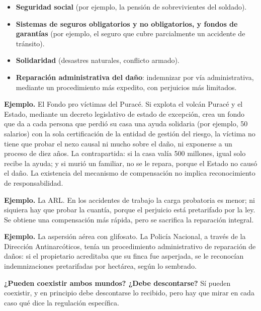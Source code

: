 \begin{itemize}
\item \textbf{Seguridad social} (por ejemplo, la pensión de sobrevivientes del soldado).
\item \textbf{Sistemas de seguros obligatorios y no obligatorios, y fondos de garantías} (por ejemplo, el seguro que cubre parcialmente un accidente de tránsito).
\item \textbf{Solidaridad} (desastres naturales, conflicto armado).
\item \textbf{Reparación administrativa del daño}: indemnizar por vía administrativa, mediante un procedimiento más expedito, con perjuicios más limitados.
\end{itemize}
\begin{ejemplo}
\textcolor[HTML]{4F6228}{\textbf{Ejemplo. }}El Fondo pro víctimas del Puracé. Si explota el volcán Puracé y el Estado, mediante un decreto legislativo de estado de excepción, crea un fondo que da a cada persona que perdió su casa una ayuda solidaria (por ejemplo, 50 salarios) con la sola certificación de la entidad de gestión del riesgo, la víctima no tiene que probar el nexo causal ni mucho sobre el daño, ni exponerse a un proceso de diez años. La contrapartida: si la casa valía 500 millones, igual solo recibe la ayuda; y si murió un familiar, no se le repara, porque el Estado no causó el daño. La existencia del mecanismo de compensación no implica reconocimiento de responsabilidad.
\par
\textcolor[HTML]{4F6228}{\textbf{Ejemplo. }}La ARL. En los accidentes de trabajo la carga probatoria es menor; ni siquiera hay que probar la cuantía, porque el perjuicio está pretarifado por la ley. Se obtiene una compensación más rápida, pero se sacrifica la reparación integral.
\par
\textcolor[HTML]{4F6228}{\textbf{Ejemplo. }}La aspersión aérea con glifosato. La Policía Nacional, a través de la Dirección Antinarcóticos, tenía un procedimiento administrativo de reparación de daños: si el propietario acreditaba que su finca fue asperjada, se le reconocían indemnizaciones pretarifadas por hectárea, según lo sembrado.
\end{ejemplo}
\textbf{¿Pueden coexistir ambos mundos? ¿Debe descontarse?} Sí pueden coexistir, y en principio debe descontarse lo recibido, pero hay que mirar en cada caso qué dice la regulación específica.


